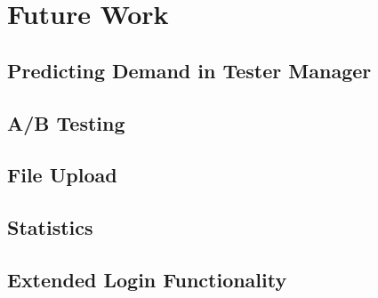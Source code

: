 \chapter{Future Work}

\section{Predicting Demand in Tester Manager}


\section{A/B Testing}


\section{File Upload}


\section{Statistics}


\section{Extended Login Functionality}


